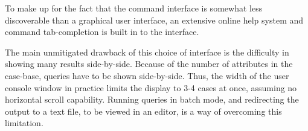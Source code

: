 \documentclass[11pt]{article}
\begin{document}
To make up for the fact that the command interface is somewhat less
discoverable than a graphical user interface, an extensive online help
system and command tab-completion is built in to the interface.

The main unmitigated drawback of this choice of interface is the
difficulty in showing many results side-by-side. Because of the number
of attributes in the case-base, queries have to be shown side-by-side.
Thus, the width of the user console window in practice limits the
display to 3-4 cases at once, assuming no horizontal scroll
capability. Running queries in batch mode, and redirecting the output
to a text file, to be viewed in an editor, is a way of overcoming this
limitation.
\end{document}
